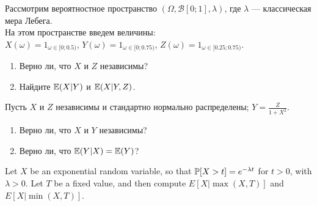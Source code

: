 \begin{problem}
Рассмотрим вероятностное пространство
$(\Omega, \mathcal{B}[0;1], \lambda)$, где $\lambda$ — классическая
мера Лебега.\\
На этом пространстве введем величины: \\
$X(\omega)=1_{\omega\in[0;0.5)}$,
$Y(\omega)=1_{\omega\in[0;0.75)}$,
$Z(\omega)=1_{\omega\in[0.25;0.75)}$.
\begin{enumerate}
\item  Верно ли, что $X$ и $Z$ независимы?
\item Найдите $\E(X|Y)$ и $\E(X|Y,Z)$.
\end{enumerate}

\begin{sol}

\end{sol}
\end{problem}

\begin{problem}
Пусть $X$ и $Z$ независимы и стандартно нормально распределены;
$Y=\frac{Z}{1+X^{2}}$.
\begin{enumerate}
\item  Верно ли, что $X$ и $Y$ независимы?
\item Верно ли, что $\E(Y|X)=\E(Y)$?
\end{enumerate}

\begin{sol}

\end{sol}
\end{problem}

\begin{problem}
 Let $X$ be an exponential random variable, so that $\P[X > t] = e^{-\lambda t}$
	for $t > 0$, with $\lambda > 0$. 	Let $T$ be a fixed value, and then compute
	$E[ X | \max(X,T) ]$ and $E[X | \min(X,T)]$.

\begin{sol}

\end{sol}
\end{problem}

